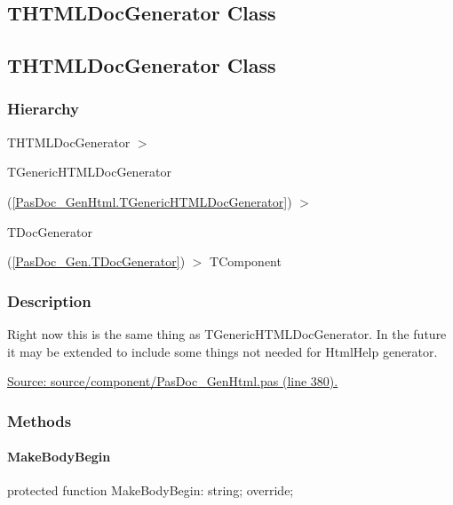 \documentclass{report}
\newif\ifpdf
\begin{document}
\subsection*{\large{\textbf{THTMLDocGenerator Class}}\normalsize\hspace{1ex}\hrulefill}
\else
\subsection*{THTMLDocGenerator Class}
\fi
\label{PasDoc_GenHtml.THTMLDocGenerator}
\subsubsection*{\large{\textbf{Hierarchy}}\normalsize\hspace{1ex}\hfill}
THTMLDocGenerator {$>$} \begin{ttfamily}TGenericHTMLDocGenerator\end{ttfamily}(\ref{PasDoc_GenHtml.TGenericHTMLDocGenerator}) {$>$} \begin{ttfamily}TDocGenerator\end{ttfamily}(\ref{PasDoc_Gen.TDocGenerator}) {$>$} 
TComponent
\subsubsection*{\large{\textbf{Description}}\normalsize\hspace{1ex}\hfill}
Right now this is the same thing as TGenericHTMLDocGenerator. In the future it may be extended to include some things not needed for HtmlHelp generator.\par
\href{https://github.com/pasdoc/pasdoc/blob/master/source/component/PasDoc_GenHtml.pas#L380}{Source: source/component/PasDoc{\_}GenHtml.pas (line 380).}\subsubsection*{\large{\textbf{Methods}}\normalsize\hspace{1ex}\hfill}
\paragraph*{MakeBodyBegin}\hspace*{\fill}

\label{PasDoc_GenHtml.THTMLDocGenerator-MakeBodyBegin}
\begin{list}{}{
\setlength{\itemindent}{0cm}
\setlength{\listparindent}{0cm}
\setlength{\leftmargin}{\evensidemargin}
\addtolength{\leftmargin}{\tmplength}
\settowidth{\labelsep}{X}
\addtolength{\leftmargin}{\labelsep}
\setlength{\labelwidth}{\tmplength}
}
\item[\textbf{Declaration}\hfill]
\ifpdf
\begin{flushleft}
\fi
\begin{ttfamily}
protected function MakeBodyBegin: string; override;\end{ttfamily}

\ifpdf
\end{flushleft}
\fi

\end{list}
\end{document}
